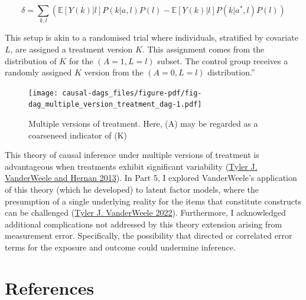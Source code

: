\documentclass[
  singlecolumn]{report}
\begin{document}
\[ \delta = \sum_{k,l} \left( \mathbb{E}[Y(k)|l] P(k|a,l) P(l) - \mathbb{E}[Y(k)|l] P(k|a^*,l) P(l) \right) \]

This setup is akin to a randomised trial where individuals, stratified
by covariate \(L\), are assigned a treatment version \(K\). This
assignment comes from the distribution of \(K\) for the
\((A = 1, L = l)\) subset. The control group receives a randomly
assigned \(K\) version from the \((A = 0, L = l)\) distribution.''

\begin{figure}

{\centering \texttt{[image: causal-dags\_files/figure-pdf/fig-dag\_multiple\_version\_treatment\_dag-1.pdf]}

}

\caption{\label{fig-dag_multiple_version_treatment_dag}Multiple versions
of treatment. Here, (A) may be regarded as a coarseneed indicator of
(K)}

\end{figure}

This theory of causal inference under multiple versions of treatment is
advantageous when treatments exhibit significant variability
(\protect\hyperlink{ref-vanderweele2013}{Tyler J. VanderWeele and Hernan
2013}). In Part 5, I explored VanderWeele's application of this theory
(which he developed) to latent factor models, where the presumption of a
single underlying reality for the items that constitute constructs can
be challenged (\protect\hyperlink{ref-vanderweele2022}{Tyler J.
VanderWeele 2022}). Furthermore, I acknowledged additional complications
not addressed by this theory extension arising from measurement error.
Specifically, the possibility that directed or correlated error terms
for the exposure and outcome could undermine inference.

\newpage{}

\hypertarget{references}{%
\section*{References}\label{references}}
\end{document}
